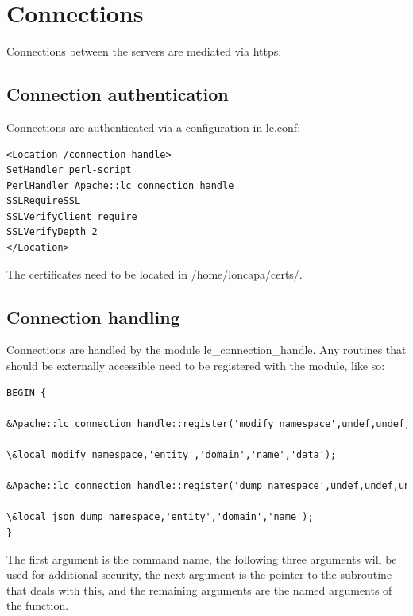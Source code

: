 \section{Connections}
Connections between the servers are mediated via https.
\subsection{Connection authentication}
Connections are authenticated via a configuration in lc.conf:
\begin{verbatim}
<Location /connection_handle>
SetHandler perl-script
PerlHandler Apache::lc_connection_handle
SSLRequireSSL
SSLVerifyClient require
SSLVerifyDepth 2
</Location>
\end{verbatim}
The certificates need to be located in /home/loncapa/certs/.

\subsection{Connection handling}
Connections are handled by the module lc\_connection\_handle. Any routines that should be externally accessible need to be registered with the module, like so:
\begin{verbatim}
BEGIN {
    &Apache::lc_connection_handle::register('modify_namespace',undef,undef,undef,
                                            \&local_modify_namespace,'entity','domain','name','data');
    &Apache::lc_connection_handle::register('dump_namespace',undef,undef,undef,
                                            \&local_json_dump_namespace,'entity','domain','name');
}
\end{verbatim}
The first argument is the command name, the following three arguments will be used for additional security, the next argument is the pointer to the subroutine that deals with this, and the remaining arguments are the named arguments of the function.
